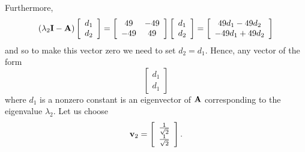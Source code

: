 \begin{solution}
\begin{enumerate}
Furthermore,
\[
\left(\lambda_2{\bf I}-{\bf A}\right)\left[\begin{array}{c}d_1 \\ d_2\end{array}\right]=\left[\begin{array}{cc}49 & -49\\-49 & 49\end{array}\right]\left[\begin{array}{c}d_1 \\ d_2\end{array}\right]=\left[\begin{array}{c}49d_1-49d_2 \\ -49d_1+49d_2\end{array}\right]
\]
and so to make this vector zero we need to set $d_2=d_1$. Hence, any vector of the form
\[
\left[\begin{array}{c}d_1 \\ d_1\end{array}\right]
\]
where $d_1$ is a nonzero constant is an eigenvector of ${\bf A}$ corresponding to the eigenvalue $\lambda_2$. Let us choose
\[
{\bf v}_2=\left[\begin{array}{c}{1\over\sqrt{2}} \\ {1\over\sqrt{2}}\end{array}\right].
\]


\end{enumerate}
\end{solution}

